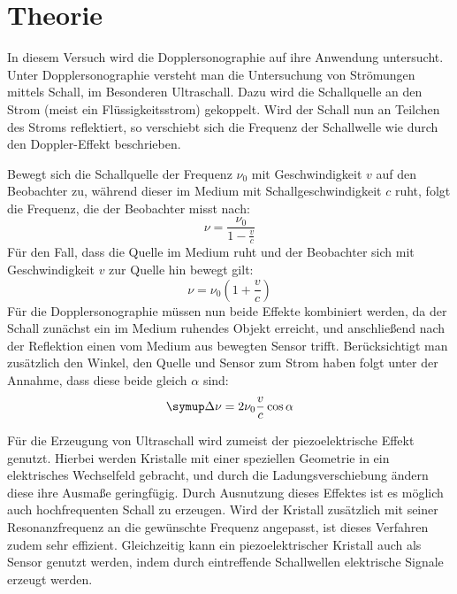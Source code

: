 \section{Theorie}
\label{sec:Theorie}
In diesem Versuch wird die Dopplersonographie auf ihre Anwendung untersucht.
Unter Dopplersonographie versteht man die Untersuchung von Strömungen mittels Schall, im Besonderen Ultraschall.
Dazu wird die Schallquelle an den Strom (meist ein Flüssigkeitsstrom) gekoppelt.
Wird der Schall nun an Teilchen des Stroms reflektiert, so verschiebt sich die Frequenz der Schallwelle wie durch den
Doppler-Effekt beschrieben.


Bewegt sich die Schallquelle der Frequenz $\nu_0$ mit Geschwindigkeit $v$ auf den Beobachter zu,
während dieser im Medium mit Schallgeschwindigkeit $c$ ruht, folgt die Frequenz, die der Beobachter misst nach:
\begin{equation}
	\nu = \frac{\nu_0}{1 - \frac{v}{c}}
\end{equation}
Für den Fall, dass die Quelle im Medium ruht und der Beobachter sich mit Geschwindigkeit $v$ zur Quelle hin bewegt gilt:
\begin{equation}
	\nu = \nu_0\left(1+\frac{v}{c}\right)
\end{equation}
Für die Dopplersonographie müssen nun beide Effekte kombiniert werden, da der Schall zunächst ein im Medium ruhendes Objekt erreicht,
und anschließend nach der Reflektion einen vom Medium aus bewegten Sensor trifft.
Berücksichtigt man zusätzlich den Winkel, den Quelle und Sensor zum Strom haben folgt unter der Annahme,
dass diese beide gleich $\alpha$ sind:
\begin{equation}
	\symup\Delta\nu = 2\nu_0\frac{v}{c}\cos \alpha
\end{equation}


Für die Erzeugung von Ultraschall wird zumeist der piezoelektrische Effekt genutzt.
Hierbei werden Kristalle mit einer speziellen Geometrie in ein elektrisches Wechselfeld gebracht,
und durch die Ladungsverschiebung ändern diese ihre Ausmaße geringfügig.
Durch Ausnutzung dieses Effektes ist es möglich auch hochfrequenten Schall zu erzeugen.
Wird der Kristall zusätzlich mit seiner Resonanzfrequenz an die gewünschte Frequenz angepasst,
ist dieses Verfahren zudem sehr effizient.
Gleichzeitig kann ein piezoelektrischer Kristall auch als Sensor genutzt werden, indem durch eintreffende Schallwellen
elektrische Signale erzeugt werden.
